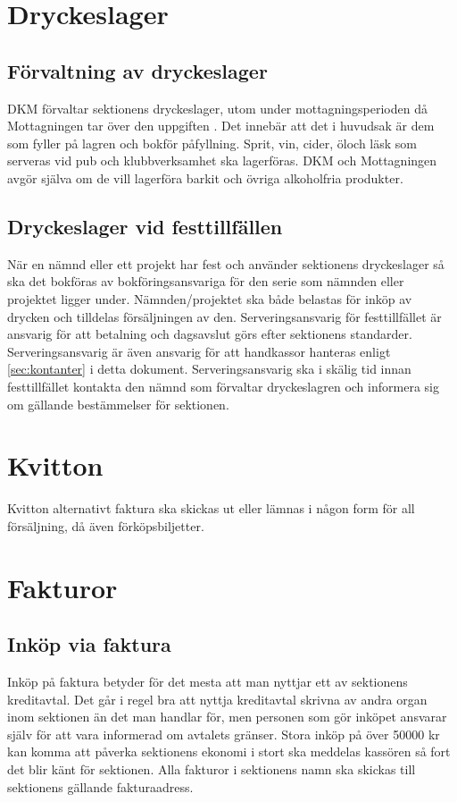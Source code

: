 \documentclass{dgovdoc}
\begin{document}
\section{Dryckeslager}
\subsection{Förvaltning av dryckeslager}
DKM förvaltar sektionens dryckeslager, utom under mottagningsperioden då Mottagningen tar över den
uppgiften . Det innebär att det i huvudsak är dem som fyller på lagren och bokför påfyllning. Sprit,
vin, cider, öloch läsk som serveras vid pub­ och klubbverksamhet ska lagerföras. DKM och Mottagningen avgör själva
om de vill lagerföra barkit och övriga alkoholfria produkter.

\subsection{Dryckeslager vid festtillfällen}
När en nämnd eller ett projekt har fest och använder sektionens dryckeslager så ska det bokföras av
bokföringsansvariga för den serie som nämnden eller projektet ligger under. Nämnden/projektet ska både
belastas för inköp av drycken och tilldelas försäljningen av den. Serveringsansvarig för festtillfället är ansvarig för att betalning och dagsavslut görs efter sektionens standarder.
Serveringsansvarig är även ansvarig för att handkassor hanteras enligt \ref{sec:kontanter} i detta dokument.
Serveringsansvarig ska i skälig tid innan festtillfället kontakta den nämnd som förvaltar dryckeslagren och
informera sig om gällande bestämmelser för sektionen.

\section{Kvitton}

Kvitton alternativt faktura ska skickas ut eller lämnas i någon form för all
försäljning, då även förköpsbiljetter.

\section{Fakturor}

\subsection{Inköp via faktura}
Inköp på faktura betyder för det mesta att man nyttjar ett av sektionens kreditavtal. Det går i regel bra att
nyttja kreditavtal skrivna av andra organ inom sektionen än det man handlar för, men personen som gör
inköpet ansvarar själv för att vara informerad om avtalets gränser. Stora inköp på över 50000 kr kan komma
att påverka sektionens ekonomi i stort ska meddelas kassören så fort det blir känt för sektionen. Alla fakturor
i sektionens namn ska skickas till sektionens gällande fakturaadress.
\end{document}
